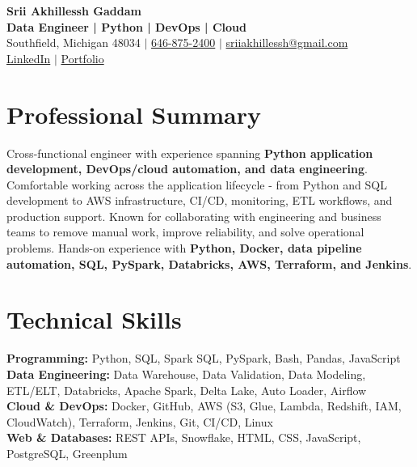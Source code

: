 \documentclass[letterpaper,10pt]{article}
\begin{document}
\fontsize{9.35pt}{10.45pt}\selectfont

\begin{center}
    {\LARGE \textbf{Srii Akhillessh Gaddam}} \\[-1pt]
    \textbf{Data Engineer | Python | DevOps | Cloud} \\[2pt]
    Southfield, Michigan 48034 $|$
    \href{tel:6468752400}{646-875-2400} $|$
    \href{mailto:sriiakhillessh@gmail.com}{sriiakhillessh@gmail.com} \\[1pt]
    \href{https://www.linkedin.com/in/srii-akhiilessh-gaddam-b48668191/}{LinkedIn} $|$
    \href{https://sriiakhillesshg.github.io/portfolio/}{Portfolio}
\end{center}
\vspace{-8pt}

\section{Professional Summary}
\small{Cross-functional engineer with experience spanning \textbf{Python application development, DevOps/cloud automation, and data engineering}. Comfortable working across the application lifecycle - from Python and SQL development to AWS infrastructure, CI/CD, monitoring, ETL workflows, and production support. Known for collaborating with engineering and business teams to remove manual work, improve reliability, and solve operational problems. Hands-on experience with \textbf{Python, Docker, data pipeline automation, SQL, PySpark, Databricks, AWS, Terraform, and Jenkins}.}

\section{Technical Skills}
\small{
\textbf{Programming:} Python, SQL, Spark SQL, PySpark, Bash, Pandas, JavaScript \\
\textbf{Data Engineering:} Data Warehouse, Data Validation, Data Modeling, ETL/ELT, Databricks, Apache Spark, Delta Lake, Auto Loader, Airflow \\
\textbf{Cloud \& DevOps:} Docker, GitHub, AWS (S3, Glue, Lambda, Redshift, IAM, CloudWatch), Terraform, Jenkins, Git, CI/CD, Linux \\
\textbf{Web \& Databases:} REST APIs, Snowflake, HTML, CSS, JavaScript, PostgreSQL, Greenplum
}
\end{document}
